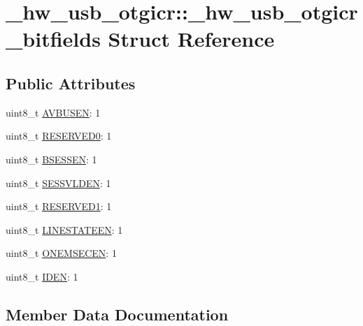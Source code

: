 \hypertarget{struct__hw__usb__otgicr_1_1__hw__usb__otgicr__bitfields}{}\section{\+\_\+hw\+\_\+usb\+\_\+otgicr\+:\+:\+\_\+hw\+\_\+usb\+\_\+otgicr\+\_\+bitfields Struct Reference}
\label{struct__hw__usb__otgicr_1_1__hw__usb__otgicr__bitfields}
\subsection*{Public Attributes}
\begin{DoxyCompactItemize}
\item 
uint8\+\_\+t \hyperlink{struct__hw__usb__otgicr_1_1__hw__usb__otgicr__bitfields_a51f102f340671a389f9d5b3240d3077b}{A\+V\+B\+U\+S\+EN}\+: 1
\item 
uint8\+\_\+t \hyperlink{struct__hw__usb__otgicr_1_1__hw__usb__otgicr__bitfields_a2744fe18f7f966cbd9ddbbdf9e0bed31}{R\+E\+S\+E\+R\+V\+E\+D0}\+: 1
\item 
uint8\+\_\+t \hyperlink{struct__hw__usb__otgicr_1_1__hw__usb__otgicr__bitfields_ad9966bfd3c8f32970d52da5daebede5f}{B\+S\+E\+S\+S\+EN}\+: 1
\item 
uint8\+\_\+t \hyperlink{struct__hw__usb__otgicr_1_1__hw__usb__otgicr__bitfields_acd17296e86837afdd7925965b6eed5e6}{S\+E\+S\+S\+V\+L\+D\+EN}\+: 1
\item 
uint8\+\_\+t \hyperlink{struct__hw__usb__otgicr_1_1__hw__usb__otgicr__bitfields_a1e18335ad059272a3d62d0116e13ba09}{R\+E\+S\+E\+R\+V\+E\+D1}\+: 1
\item 
uint8\+\_\+t \hyperlink{struct__hw__usb__otgicr_1_1__hw__usb__otgicr__bitfields_a6d6405b5d9fb01ba5012c888a5b7e308}{L\+I\+N\+E\+S\+T\+A\+T\+E\+EN}\+: 1
\item 
uint8\+\_\+t \hyperlink{struct__hw__usb__otgicr_1_1__hw__usb__otgicr__bitfields_ab7e517b3aa64899c0d330b31325f0702}{O\+N\+E\+M\+S\+E\+C\+EN}\+: 1
\item 
uint8\+\_\+t \hyperlink{struct__hw__usb__otgicr_1_1__hw__usb__otgicr__bitfields_aad194996fedb34989b9cffcb67280ea4}{I\+D\+EN}\+: 1
\end{DoxyCompactItemize}


\subsection{Member Data Documentation}
